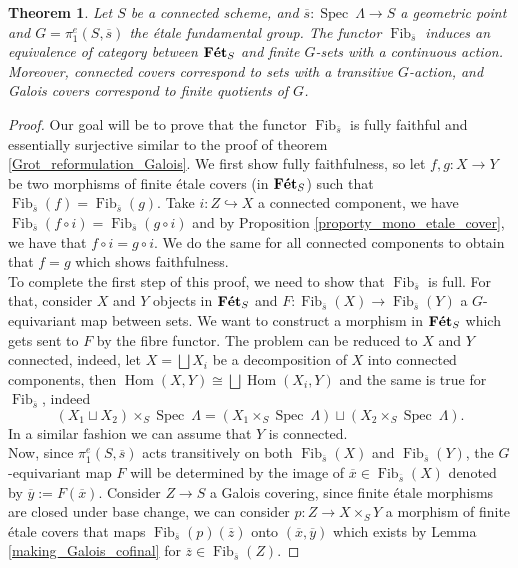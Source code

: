 \documentclass{article}
\theoremstyle{plain}
\newtheorem{theorem}{Theorem}[subsection]
\theoremstyle{definition}
\DeclareMathOperator{\Hom}{Hom}
\DeclareMathOperator{\Fib}{Fib}
\DeclareMathOperator{\Spec}{Spec}
\DeclareMathOperator{\Fet}{\bf{F\acute{e}t}}
\begin{document}
\begin{theorem}
\label{main_theorem_etale_fundamental_group}
     Let $S$ be a connected scheme, and $\overline{s}:\Spec\: \Lambda \rightarrow S$ a geometric point and $G = \pi_1^e(S,\overline{s})$ the \'etale fundamental group.
     The functor $\Fib_{\overline{s}}$ induces an equivalence of category between $\Fet_S$ and finite $G$-sets with a continuous action. 
     Moreover, connected covers correspond to sets with a transitive $G$-action, 
     and Galois covers correspond to finite quotients of $G$.
\end{theorem}
\begin{proof}
    Our goal will be to prove that the functor $\Fib_{\overline{s}}$ is fully faithful and essentially surjective similar to the proof of theorem \ref{Grot_reformulation_Galois}.
    We first show fully faithfulness, so let $f,g:X\rightarrow Y$ be two morphisms of finite \'etale covers (in $\Fet_S$) such that $\Fib_{\overline{s}}(f) = \Fib_{\overline{s}}(g)$.
    Take $i: Z\hookrightarrow X$ a connected component, we have $\Fib_{\overline{s}}(f\circ i)= \Fib_{\overline{s}}(g\circ i)$ and by Proposition \ref{proporty_mono_etale_cover}, we have that $f\circ i = g\circ i$. We do the same for all connected components to obtain that $f = g$ which shows faithfulness.\\
    To complete the first step of this proof, we need to show that $\Fib_{\overline{s}}$ is full. For that, consider $X$ and $Y$ objects in $\Fet_S$ and $F: \Fib_{\overline{s}}(X)\rightarrow \Fib_{\overline{s}}(Y)$ a $G$-equivariant map between sets. 
    We want to construct a morphism in $\Fet_S$ which gets sent to $F$ by the fibre functor.
    The problem can be reduced to $X$ and $Y$ connected, indeed, let $X = \bigsqcup X_i$ be a decomposition of $X$ into connected components, then $\Hom(X,Y) \cong \bigsqcup \Hom(X_i,Y)$ and the same is true for $\Fib_{\overline{s}}$, indeed
    $$(X_1\sqcup X_2) \times_S \Spec\:\Lambda = (X_1\times_S\Spec\:\Lambda) \sqcup(X_2\times_S\Spec\:\Lambda).$$
    In a similar fashion we can assume that $Y$ is connected.\\
    Now, since $\pi_1^e(S,\overline{s})$ acts transitively on both $\Fib_{\overline{s}}(X)$ and $\Fib_{\overline{s}}(Y)$, the $G$-equivariant map $F$ will be determined by the image of $\overline{x}\in \Fib_{\overline{s}}(X)$ denoted by $\overline{y}:= F(\overline{x})$.
    Consider $Z\rightarrow S$ a Galois covering, since finite \'etale morphisms are closed under base change, 
    we can consider $p:Z\rightarrow X\times_S Y$ a morphism of finite \'etale covers that maps $\Fib_{\overline{s}}(p)(\overline{z})$ onto $(\overline{x},\overline{y})$ which exists by Lemma \ref{making_Galois_cofinal} for $\overline{z}\in\Fib_{\overline{s}}(Z)$.

\end{proof}
\end{document}
